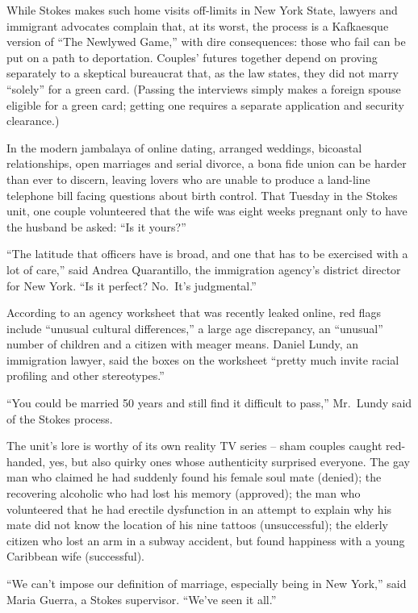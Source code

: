 ﻿\documentclass[12pt]{article}
\begin{document}
While Stokes makes such home visits off-limits in New York State, lawyers and immigrant advocates
complain that, at its worst, the process is a Kafkaesque version of ``The Newlywed Game,'' with dire
consequences: those who fail can be put on a path to deportation. Couples' futures together depend
on proving separately to a skeptical bureaucrat that, as the law states, they did not marry
``solely'' for a green card. (Passing the interviews simply makes a foreign spouse eligible for a
green card; getting one requires a separate application and security clearance.)

In the modern jambalaya of online dating, arranged weddings, bicoastal relationships, open marriages
and serial divorce, a bona fide union can be harder than ever to discern, leaving lovers who are
unable to produce a land-line telephone bill facing questions about birth control. That Tuesday in
the Stokes unit, one couple volunteered that the wife was eight weeks pregnant only to have the
husband be asked: ``Is it yours?''

``The latitude that officers have is broad, and one that has to be exercised with a lot of care,''
said Andrea Quarantillo, the immigration agency's district director for New York. ``Is it perfect?
No.~It's judgmental.''

According to an agency worksheet that was recently leaked online, red flags include ``unusual
cultural differences,'' a large age discrepancy, an ``unusual'' number of children and a citizen
with meager means. Daniel Lundy, an immigration lawyer, said the boxes on the worksheet ``pretty
much invite racial profiling and other stereotypes.''

``You could be married 50 years and still find it difficult to pass,'' Mr.~Lundy said of the Stokes
process.

The unit's lore is worthy of its own reality TV series -- sham couples caught red-handed, yes, but
also quirky ones whose authenticity surprised everyone. The gay man who claimed he had suddenly
found his female soul mate (denied); the recovering alcoholic who had lost his memory (approved);
the man who volunteered that he had erectile dysfunction in an attempt to explain why his mate did
not know the location of his nine tattoos (unsuccessful); the elderly citizen who lost an arm in a
subway accident, but found happiness with a young Caribbean wife (successful).

``We can't impose our definition of marriage, especially being in New York,'' said Maria Guerra, a
Stokes supervisor. ``We've seen it all.''
\end{document}
